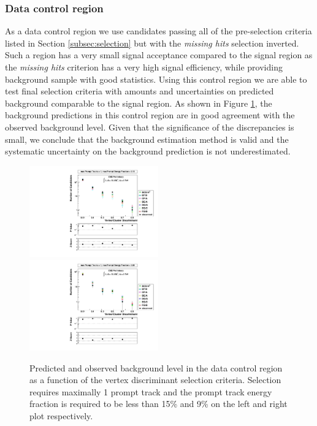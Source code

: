 \subsubsection{Data control region}
\label{subsubsec:bkgCtrl}

As a data control region we use candidates passing all of the pre-selection criteria listed in Section
 \ref{subsec:selection} but with the {\it missing hits} selection inverted. Such a region has a very small 
signal acceptance compared to the signal region as the {\it missing hits} criterion has a very high signal 
efficiency, while providing
background sample with good statistics. Using this control region we are able to test final selection
criteria with amounts and uncertainties on predicted background comparable to the signal region. 
 As shown in Figure \ref{fig:bkg_NMiss}, 
the background predictions in this control region are in good agreement 
with the observed background level. Given that the significance
of the discrepancies is small, we conclude
that the background estimation method is valid and the systematic uncertainty on the background
 prediction is not underestimated.

\begin{figure}[htbp]
\centering
\includegraphics[width=0.495\textwidth]{plots/background/bkg_NMiss1.pdf}
\includegraphics[width=0.495\textwidth]{plots/background/bkg_NMiss2.pdf}
\caption{Predicted and observed background level in the data control region as a function of the vertex
discriminant selection criteria. Selection requires maximally 1 prompt track and the prompt track energy fraction
is required to be less than 15\% and 9\% on the left and right plot respectively.\label{fig:bkg_NMiss}}
\end{figure}

